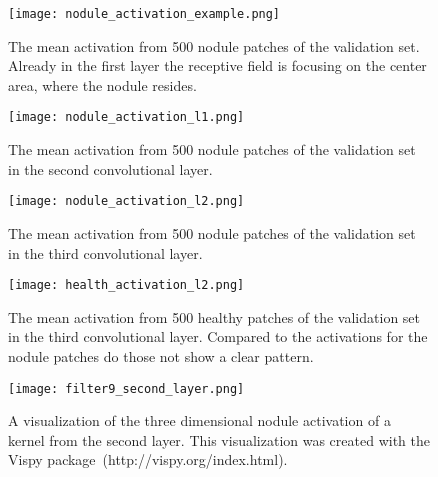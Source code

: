 \documentclass[main.tex]{subfiles}
\begin{document}
\begin{figure}[H]
\begin{center}
\texttt{[image: nodule\_activation\_example.png]}
\end{center}
\caption{The mean activation from 500 nodule patches of the validation set. Already in the first layer the receptive field is focusing on the center area, where the nodule resides.}
\label{fig:mean_activation}
\end{figure}

\begin{figure}
\begin{center}
\texttt{[image: nodule\_activation\_l1.png]}
\end{center}
\caption{The mean activation from 500 nodule patches of the validation set in the second convolutional layer.}
\label{fig:mean_activation_l1}
\end{figure}

\begin{figure}
\begin{center}
\texttt{[image: nodule\_activation\_l2.png]}
\end{center}
\caption{The mean activation from 500 nodule patches of the validation set in the third convolutional layer.}
\label{fig:mean_activation_l2}
\end{figure}

\begin{figure}
\begin{center}
\texttt{[image: health\_activation\_l2.png]}
\end{center}
\caption{The mean activation from 500 healthy patches of the validation set in the third convolutional layer. Compared to the activations for the nodule patches do those not show a clear pattern.}
\label{fig:mean_activation_l2_health}
\end{figure}


\begin{figure}
\begin{center}
\texttt{[image: filter9\_second\_layer.png]}
\end{center}
\caption{A visualization of the three dimensional nodule activation of a kernel from the second layer. This visualization was created with the Vispy package~(http://vispy.org/index.html).}
\label{fig:3d_activation}
\end{figure}
\end{document}
